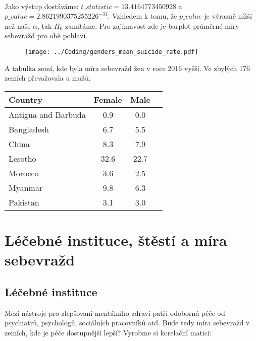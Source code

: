 \documentclass[12pt]{article}
\begin{document}
\paragraph{}
Jako výstup dostáváme: $t\_statistic = 13.4164773450928$ a $p\_value = 2.8621990375255226^{-31}$. Vzhledem k tomu, že $p\_value$ je výrazně nížší než naše $\alpha$, tak $H_0$ zamítáme. Pro zajímavost zde je barplot průměrné míry sebevražd pro obě pohlaví. 
\begin{figure}[hbt]
  \centering
  \texttt{[image: ../Coding/genders\_mean\_suicide\_rate.pdf]}
  \label{fig:plot}
\end{figure}

\newpage
A tabulka zemí, kde byla míra sebevražd žen v roce 2016 vyšší. Ve zbylých 176 zemích převažovala u mužů.
\begin{table}[htb]
\centering
\label{tab:suicide-rates}
\begin{tabular}{lccc}
\hline
Country & Female & Male \\
\hline
Antigua and Barbuda & 0.9 & 0.0 \\
Bangladesh & 6.7 & 5.5 \\
China & 8.3 & 7.9 \\
Lesotho & 32.6 & 22.7 \\
Morocco & 3.6 & 2.5 \\
Myanmar & 9.8 & 6.3 \\
Pakistan & 3.1 & 3.0 \\
\hline
\end{tabular}
\end{table}

\section{Léčebné instituce, štěstí a míra sebevražd}
\subsection{Léčebné instituce}
	Mezi nástroje pro zlepšovaní mentálního zdraví patří odoborná péče od psychiatrů, psychologů, sociálních pracovníků atd. Bude tedy míra sebevražd v zemích, kde je péče dostupnější lepší? Vyrobme si korelační matici: \\
\end{document}
